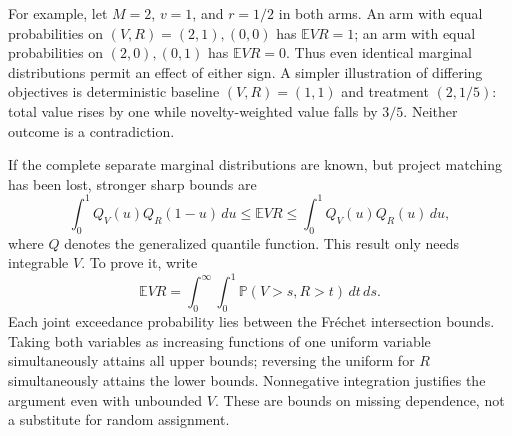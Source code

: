 \documentclass[11pt]{article}
\newcommand{\E}{\mathbb E}
\newcommand{\Prb}{\mathbb P}
\begin{document}
For example, let $M=2$, $v=1$, and $r=1/2$ in both arms. An arm with equal probabilities on $(V,R)=(2,1),(0,0)$ has $\E VR=1$; an arm with equal probabilities on $(2,0),(0,1)$ has $\E VR=0$. Thus even identical marginal distributions permit an effect of either sign. A simpler illustration of differing objectives is deterministic baseline $(V,R)=(1,1)$ and treatment $(2,1/5)$: total value rises by one while novelty-weighted value falls by $3/5$. Neither outcome is a contradiction.

If the complete separate marginal distributions are known, but project matching has been lost, stronger sharp bounds are
\[
 \int_0^1 Q_V(u)Q_R(1-u)\,du
 \leq \E VR \leq
 \int_0^1 Q_V(u)Q_R(u)\,du,                              \tag{2}
\]
where $Q$ denotes the generalized quantile function. This result only needs integrable $V$. To prove it, write
\[
 \E VR=\int_0^\infty\int_0^1\Prb(V>s,R>t)\,dt\,ds.
\]
Each joint exceedance probability lies between the Fr\'echet intersection bounds. Taking both variables as increasing functions of one uniform variable simultaneously attains all upper bounds; reversing the uniform for $R$ simultaneously attains the lower bounds. Nonnegative integration justifies the argument even with unbounded $V$. These are bounds on missing dependence, not a substitute for random assignment.
\end{document}
